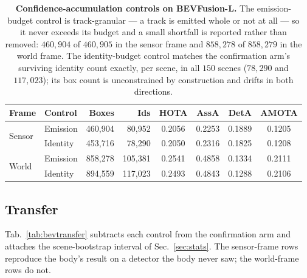 \begin{table}[t]
\centering\footnotesize
\setlength{\tabcolsep}{6pt}
\begin{tabular}{llrrcccc}
\toprule
Frame & Control & Boxes & Ids & HOTA & AssA & DetA & AMOTA \\
\midrule
\multirow{2}{*}{Sensor}
 & Emission & 460{,}904 &  80{,}952 & 0.2056 & 0.2253 & 0.1889 & 0.1205 \\
 & Identity & 453{,}716 &  78{,}290 & 0.2050 & 0.2316 & 0.1825 & 0.1208 \\
\midrule
\multirow{2}{*}{World}
 & Emission & 858{,}278 & 105{,}381 & 0.2541 & 0.4858 & 0.1334 & 0.2111 \\
 & Identity & 894{,}559 & 117{,}023 & 0.2493 & 0.4843 & 0.1288 & 0.2106 \\
\bottomrule
\end{tabular}
\caption{\textbf{Confidence-accumulation controls on BEVFusion-L.} The
emission-budget control is track-granular --- a track is emitted whole or not
at all --- so it never exceeds its budget and a small shortfall is reported
rather than removed: $460{,}904$ of $460{,}905$ in the sensor frame and
$858{,}278$ of $858{,}279$ in the world frame. The identity-budget control
matches the confirmation arm's surviving identity count exactly, per scene, in
all $150$ scenes ($78{,}290$ and $117{,}023$); its box count is unconstrained
by construction and drifts in both directions.}
\label{tab:bevphase2}
\end{table}

\subsection*{Transfer}
Tab.~\ref{tab:bevtransfer} subtracts each control from the confirmation arm and
attaches the scene-bootstrap interval of Sec.~\ref{sec:stats}. The sensor-frame
rows reproduce the body's result on a detector the body never saw; the
world-frame rows do not.

